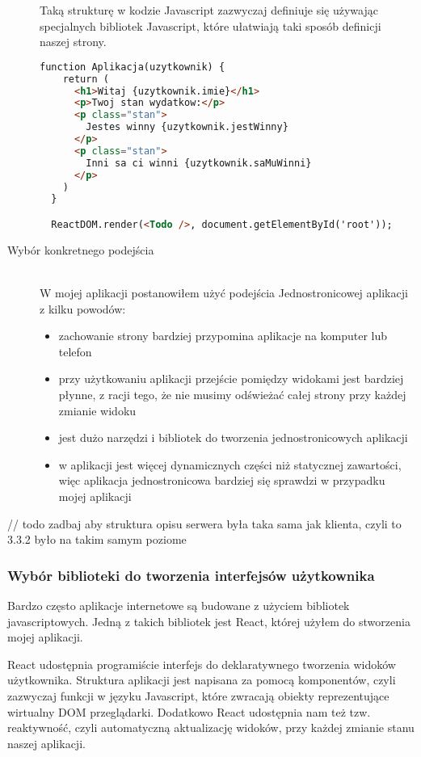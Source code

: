 \begin{description}
  Taką strukturę w kodzie Javascript zazwyczaj definiuje się używając specjalnych bibliotek Javascript, które ułatwiają taki sposób definicji naszej strony.

  \begin{lstlisting}[language=HTML, caption=Przykład aplikacji z użyciem biblioteki Javascriptowej, label={lst:reactCode}]
  function Aplikacja(uzytkownik) {
    return (
      <h1>Witaj {uzytkownik.imie}</h1>
      <p>Twoj stan wydatkow:</p>
      <p class="stan">
        Jestes winny {uzytkownik.jestWinny}
      </p>
      <p class="stan">
        Inni sa ci winni {uzytkownik.saMuWinni}
      </p>
    )
  }

  ReactDOM.render(<Todo />, document.getElementById('root'));
  \end{lstlisting}
  \item[Wybór konkretnego podejścia] \hfill \\ W mojej aplikacji postanowiłem użyć podejścia Jednostronicowej aplikacji z kilku powodów:
  \begin{itemize}
    \item zachowanie strony bardziej przypomina aplikacje na komputer lub telefon
    \item przy użytkowaniu aplikacji przejście pomiędzy widokami jest bardziej płynne, z racji tego, że nie musimy odświeżać całej strony przy każdej zmianie widoku
    \item jest dużo narzędzi i bibliotek do tworzenia jednostronicowych aplikacji
    \item w aplikacji jest więcej dynamicznych części niż statycznej zawartości, więc aplikacja jednostronicowa bardziej się sprawdzi w przypadku mojej aplikacji
  \end{itemize}
\end{description}

// todo zadbaj aby struktura opisu serwera była taka sama jak klienta, czyli to 3.3.2 było na takim samym poziome
\subsubsection{Wybór biblioteki do tworzenia interfejsów użytkownika}
Bardzo często aplikacje internetowe są budowane z użyciem bibliotek javascriptowych. Jedną z takich bibliotek jest React, której użyłem do stworzenia mojej aplikacji.

React udostępnia programiście interfejs do deklaratywnego tworzenia widoków użytkownika. Struktura aplikacji jest napisana za pomocą komponentów, czyli zazwyczaj funkcji w języku Javascript, które zwracają obiekty reprezentujące wirtualny DOM przeglądarki. Dodatkowo React udostępnia nam też tzw. reaktywność, czyli automatyczną aktualizację widoków, przy każdej zmianie stanu naszej aplikacji.

